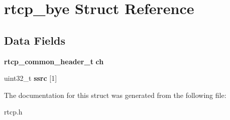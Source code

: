 \section{rtcp\+\_\+bye Struct Reference}
\label{structrtcp__bye}
\subsection*{Data Fields}
\begin{DoxyCompactItemize}
\item 
\mbox{\label{structrtcp__bye_a0a076cc34f03d66ebfbe1bc66f5fbd2e}} 
\textbf{ rtcp\+\_\+common\+\_\+header\+\_\+t} {\bfseries ch}
\item 
\mbox{\label{structrtcp__bye_ab0dc0067a9b10cc3559236347ddeb904}} 
uint32\+\_\+t {\bfseries ssrc} [1]
\end{DoxyCompactItemize}


The documentation for this struct was generated from the following file\+:\begin{DoxyCompactItemize}
\item 
rtcp.\+h\end{DoxyCompactItemize}
